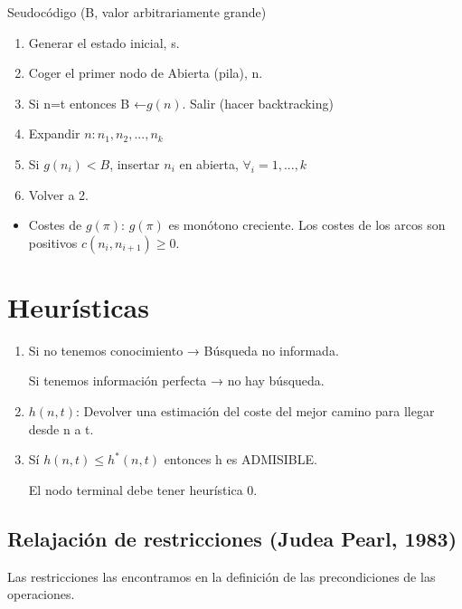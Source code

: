 \documentclass[12pt, twoside, openright]{report} %
\begin{document}
	Seudocódigo (B, valor arbitrariamente grande)

    \begin{enumerate}
    \def\labelenumi{\arabic{enumi}.}
  
    \item
      Generar el estado inicial, s.
    \item
      Coger el primer nodo de Abierta (pila), n.
    \item
      Si n=t entonces B ←\(g(n)\). Salir (hacer backtracking)
    \item
      Expandir \(n: n_1, n_2, ..., n_k\)
    \item
      Si \(g(n_i)<B\), insertar \(n_i\) en abierta,
      \(\forall _i=1,..., k\)
    \item
      Volver a 2.
    \end{enumerate}

    \begin{itemize}
  
    \item
      Costes de \(g(\pi)\): \(g(\pi)\) es monótono creciente. Los costes
      de los arcos son positivos \(c(n_i,n_{i+1}) \geq 0\).
    \end{itemize}

	
\section{Heurísticas}

  \begin{enumerate}
  \def\labelenumi{\arabic{enumi}.}
  \item
    Si no tenemos conocimiento → Búsqueda no informada.

    Si tenemos información perfecta → no hay búsqueda.
  \item
    \(h(n,t)\): Devolver una estimación del coste del mejor camino para
    llegar desde n a t.
  \item
    Sí \(h(n,t) \leq h^*(n,t)\) entonces h es ADMISIBLE.

    El nodo terminal debe tener heurística 0.
  \end{enumerate}

\subsection{Relajación de restricciones (Judea Pearl, 1983)}



    Las restricciones las encontramos en la definición de las
    precondiciones de las operaciones.
\end{document}
